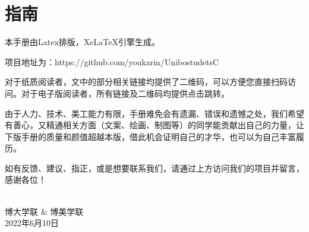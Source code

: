 
% 
%
%
%








\clearpage{\pagestyle{empty}\cleardoublepage}
\chapter*{指南}
\thispagestyle{empty}

本手册由Latex排版，XeLaTeX引擎生成。

\vspace{0.5cm}
项目地址为：https://github.com/youkarin/UnibostudetsC

\vspace{0.5cm}
对于纸质阅读者，文中的部分相关链接均提供了二维码，可以方便您直接扫码访问。对于电子版阅读者，所有链接及二维码均提供点击跳转。

\vspace{0.5cm}
由于人力、技术、美工能力有限，手册难免会有遗漏、错误和遗憾之处，我们希望有善心，又精通相关方面（文案、绘画、制图等）的同学能贡献出自己的力量，让下版手册的质量和颜值超越本版，借此机会证明自己的才华，也可以为自己丰富履历。

\vspace{0.5cm}
如有反馈、建议、指正，或是想要联系我们，请通过上方访问我们的项目并留言，感谢各位！\\\\
\begin{flushright}
博大学联 \& 博美学联 \\
2022年6月10日
\end{flushright}